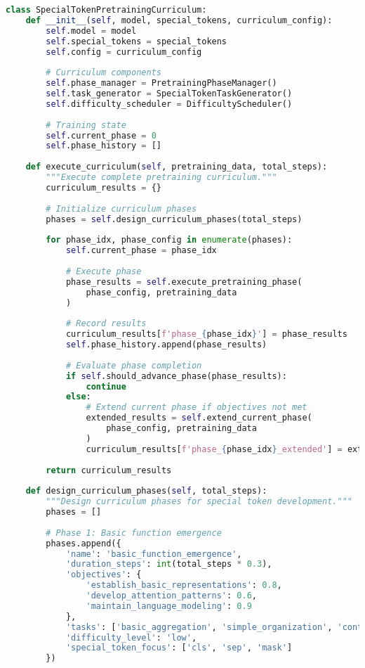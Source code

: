 \begin{lstlisting}[language=Python, caption=Progressive curriculum framework for special token pretraining]
class SpecialTokenPretrainingCurriculum:
    def __init__(self, model, special_tokens, curriculum_config):
        self.model = model
        self.special_tokens = special_tokens
        self.config = curriculum_config
        
        # Curriculum components
        self.phase_manager = PretrainingPhaseManager()
        self.task_generator = SpecialTokenTaskGenerator()
        self.difficulty_scheduler = DifficultyScheduler()
        
        # Training state
        self.current_phase = 0
        self.phase_history = []
        
    def execute_curriculum(self, pretraining_data, total_steps):
        """Execute complete pretraining curriculum."""
        curriculum_results = {}
        
        # Initialize curriculum phases
        phases = self.design_curriculum_phases(total_steps)
        
        for phase_idx, phase_config in enumerate(phases):
            self.current_phase = phase_idx
            
            # Execute phase
            phase_results = self.execute_pretraining_phase(
                phase_config, pretraining_data
            )
            
            # Record results
            curriculum_results[f'phase_{phase_idx}'] = phase_results
            self.phase_history.append(phase_results)
            
            # Evaluate phase completion
            if self.should_advance_phase(phase_results):
                continue
            else:
                # Extend current phase if objectives not met
                extended_results = self.extend_current_phase(
                    phase_config, pretraining_data
                )
                curriculum_results[f'phase_{phase_idx}_extended'] = extended_results
        
        return curriculum_results
    
    def design_curriculum_phases(self, total_steps):
        """Design curriculum phases for special token development."""
        phases = []
        
        # Phase 1: Basic function emergence
        phases.append({
            'name': 'basic_function_emergence',
            'duration_steps': int(total_steps * 0.3),
            'objectives': {
                'establish_basic_representations': 0.8,
                'develop_attention_patterns': 0.6,
                'maintain_language_modeling': 0.9
            },
            'tasks': ['basic_aggregation', 'simple_organization', 'content_interaction'],
            'difficulty_level': 'low',
            'special_token_focus': ['cls', 'sep', 'mask']
        })
        

\end{lstlisting}
